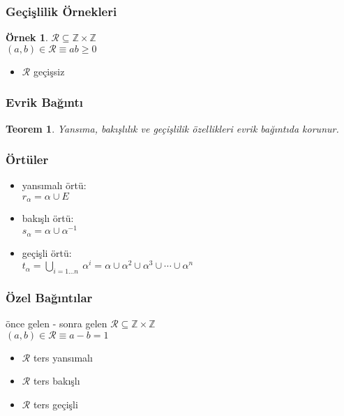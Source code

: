 \documentclass[dvipsnames]{beamer}
\theoremstyle{definition}
\theoremstyle{example}
\newtheorem{ornek}[theorem]{Örnek}
\theoremstyle{plain}
\newtheorem{teorem}[theorem]{Teorem}
\begin{document}
\begin{frame}
  \frametitle{Geçişlilik Örnekleri}

  \begin{ornek}
    $\mathcal{R} \subseteq \mathbb{Z} \times \mathbb{Z}$\\
    $(a,b) \in \mathcal{R} \equiv ab \geq 0$

    \medskip
    \begin{itemize}
      \item $\mathcal{R}$ geçişsiz
    \end{itemize}
  \end{ornek}
\end{frame}

\begin{frame}
  \frametitle{Evrik Bağıntı}

  \begin{teorem}
    Yansıma, bakışlılık ve geçişlilik özellikleri evrik bağıntıda korunur.
  \end{teorem}
\end{frame}

\begin{frame}
  \frametitle{Örtüler}

  \begin{itemize}
    \item yansımalı örtü:\\
      $r_{\alpha} = \alpha \cup E$

    \pause
    \medskip
    \item bakışlı örtü:\\
      $s_{\alpha} = \alpha \cup \alpha^{-1}$

    \pause
    \medskip
    \item geçişli örtü:\\
      $t_{\alpha} = \bigcup_{i=1 \dots n}~\alpha^i
        = \alpha \cup \alpha^2 \cup \alpha^3 \cup \cdots \cup \alpha^n$
  \end{itemize}
\end{frame}

\begin{frame}
  \frametitle{Özel Bağıntılar}

  \begin{block}{önce gelen - sonra gelen}
    $\mathcal{R} \subseteq \mathbb{Z} \times \mathbb{Z}$\\
    $(a,b) \in \mathcal{R} \equiv a-b=1$

    \medskip
    \begin{itemize}
      \item $\mathcal{R}$ ters yansımalı
      \item $\mathcal{R}$ ters bakışlı
      \item $\mathcal{R}$ ters geçişli
    \end{itemize}
  \end{block}
\end{frame}
\end{document}
